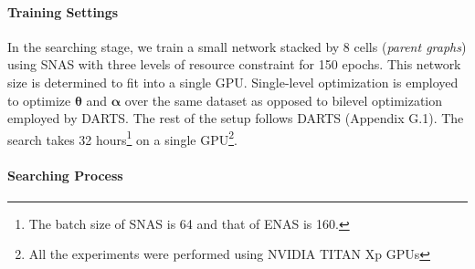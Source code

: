 \documentclass{article} \usepackage{iclr2019_conference,times}
\begin{document}
\paragraph{Training Settings}

In the searching stage, we train a small network stacked by 8 cells (\textit{parent graphs}) using SNAS with three levels of resource constraint for 150 epochs. This network size is determined to fit into a single GPU. Single-level optimization is employed to optimize $\bm{\theta}$ and $\bm{\alpha}$ over the same dataset as opposed to bilevel optimization employed by DARTS. The rest of the setup follows DARTS (Appendix G.1). The search takes 32 hours\footnote{The batch size of SNAS is 64 and that of ENAS is 160.} on a single GPU\footnote{All the experiments were performed using NVIDIA TITAN Xp GPUs}.

\paragraph{Searching Process}
\end{document}
